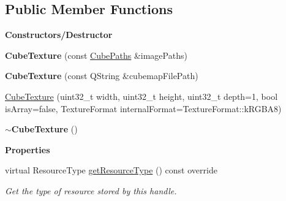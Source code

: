 \subsection*{Public Member Functions}
\begin{Indent}\textbf{ Constructors/\+Destructor}\par
\begin{DoxyCompactItemize}
\item 
\mbox{\label{classrev_1_1_cube_texture_a14e3ef96773f4b4a011cff22dce3e16a}} 
{\bfseries Cube\+Texture} (const \mbox{\hyperlink{structrev_1_1_cube_paths}{Cube\+Paths}} \&image\+Paths)
\item 
\mbox{\label{classrev_1_1_cube_texture_a6f15945904cb7920a0706c7ce066f88d}} 
{\bfseries Cube\+Texture} (const Q\+String \&cubemap\+File\+Path)
\item 
\mbox{\hyperlink{classrev_1_1_cube_texture_a5fa7f0aa9331e10423399ac941f5c4ff}{Cube\+Texture}} (uint32\+\_\+t width, uint32\+\_\+t height, uint32\+\_\+t depth=1, bool is\+Array=false, Texture\+Format internal\+Format=Texture\+Format\+::k\+R\+G\+B\+A8)
\item 
\mbox{\label{classrev_1_1_cube_texture_a01e170f42e5607e373684451ae415b0d}} 
{\bfseries $\sim$\+Cube\+Texture} ()
\end{DoxyCompactItemize}
\end{Indent}
\begin{Indent}\textbf{ Properties}\par
\begin{DoxyCompactItemize}
\item 
\mbox{\label{classrev_1_1_cube_texture_af09c740b6e9e103c074e312a8c26e4c7}} 
virtual Resource\+Type \mbox{\hyperlink{classrev_1_1_cube_texture_af09c740b6e9e103c074e312a8c26e4c7}{get\+Resource\+Type}} () const override
\begin{DoxyCompactList}\small\item\em Get the type of resource stored by this handle. \end{DoxyCompactList}\end{DoxyCompactItemize}
\end{Indent}
